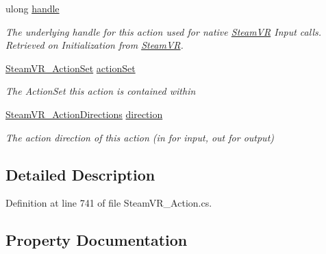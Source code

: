 \begin{DoxyCompactItemize}
ulong \mbox{\hyperlink{interface_valve_1_1_v_r_1_1_i_steam_v_r___action___source_a8f32f3e77335f4266e326200072a216c}{handle}}
\begin{DoxyCompactList}\small\item\em The underlying handle for this action used for native \mbox{\hyperlink{class_valve_1_1_v_r_1_1_steam_v_r}{Steam\+VR}} Input calls. Retrieved on Initialization from \mbox{\hyperlink{class_valve_1_1_v_r_1_1_steam_v_r}{Steam\+VR}}. \end{DoxyCompactList}\item 
\mbox{\hyperlink{class_valve_1_1_v_r_1_1_steam_v_r___action_set}{Steam\+V\+R\+\_\+\+Action\+Set}} \mbox{\hyperlink{interface_valve_1_1_v_r_1_1_i_steam_v_r___action___source_a85095931b202ff69185fceaf75e5503a}{action\+Set}}
\begin{DoxyCompactList}\small\item\em The Action\+Set this action is contained within \end{DoxyCompactList}\item 
\mbox{\hyperlink{namespace_valve_1_1_v_r_a1e6192cb5ddaf204afab87ccb5728780}{Steam\+V\+R\+\_\+\+Action\+Directions}} \mbox{\hyperlink{interface_valve_1_1_v_r_1_1_i_steam_v_r___action___source_ad1fb56d52a28f0c621007a6b3ea7a71b}{direction}}
\begin{DoxyCompactList}\small\item\em The action direction of this action (in for input, out for output) \end{DoxyCompactList}\end{DoxyCompactItemize}


\subsection{Detailed Description}


Definition at line 741 of file Steam\+V\+R\+\_\+\+Action.\+cs.



\subsection{Property Documentation}
\mbox{\label{interface_valve_1_1_v_r_1_1_i_steam_v_r___action___source_a85095931b202ff69185fceaf75e5503a}} 
